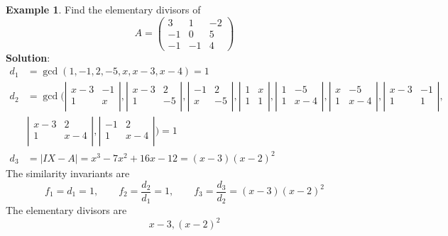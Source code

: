 \documentclass{article}
\theoremstyle{definition}
\newtheorem{exmp}[thm]{Example}
\theoremstyle{remark}
\begin{document}
\begin{exmp}
Find the elementary divisors of
$$
  A= \left(
    \begin{matrix}
      3 & 1 &-2 \\
     -1 & 0 & 5 \\
     -1 &-1 & 4
    \end{matrix}
    \right)
$$
\textbf{Solution}:
\begin{align*}
d_1&=\gcd(1,-1,2,-5,x,x-3,x-4)=1\\
d_2&=\gcd\biggl( \left|
    \begin{matrix}
      x-3 & -1  \\
      1 & x  \\
    \end{matrix}
    \right|,
    \left|
    \begin{matrix}
      x-3 & 2  \\
      1 & -5  \\
    \end{matrix}
    \right|,
    \left|
    \begin{matrix}
      -1 & 2  \\
      x & -5  \\
    \end{matrix}
    \right|,
    \left|
    \begin{matrix}
      1 & x  \\
      1 & 1  \\
    \end{matrix}
    \right|,
    \left|
    \begin{matrix}
      1 & -5  \\
      1 & x-4  \\
    \end{matrix}
    \right|,
    \left|
    \begin{matrix}
      x & -5  \\
      1 & x-4  \\
    \end{matrix}
    \right|,
    \left|
    \begin{matrix}
      x-3 & -1  \\
      1 & 1  \\
    \end{matrix}
    \right|,\\
    &\left|
    \begin{matrix}
      x-3 & 2  \\
      1 & x-4  \\
    \end{matrix}
    \right|,
    \left|
    \begin{matrix}
      -1 & 2  \\
      1 & x-4  \\
    \end{matrix}
    \right|
     \biggl)=1\\
d_3&=|IX-A|=x^3-7x^2+16x-12=(x-3)(x-2)^2
\end{align*}
The similarity invariants are
$$f_1=d_1=1, \qquad f_2=\frac{d_2}{d_1}=1, \qquad f_3=\frac{d_3}{d_2}=(x-3)(x-2)^2$$
The elementary divisors are
  $$x-3, (x-2)^2$$
\end{exmp}
\end{document}
